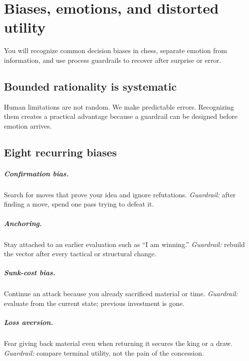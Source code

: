 
\chapter{Biases, emotions, and distorted utility}
\begin{learningbox}
You will recognize common decision biases in chess, separate emotion from information, and use process guardrails to recover after surprise or error.
\end{learningbox}

\section{Bounded rationality is systematic}
Human limitations are not random. We make predictable errors. Recognizing them creates a practical advantage because a guardrail can be designed before emotion arrives.

\section{Eight recurring biases}
\paragraph{Confirmation bias.} Search for moves that prove your idea and ignore refutations. \textit{Guardrail:} after finding a move, spend one pass trying to defeat it.

\paragraph{Anchoring.} Stay attached to an earlier evaluation such as ``I am winning.'' \textit{Guardrail:} rebuild the vector after every tactical or structural change.

\paragraph{Sunk-cost bias.} Continue an attack because you already sacrificed material or time. \textit{Guardrail:} evaluate from the current state; previous investment is gone.

\paragraph{Loss aversion.} Fear giving back material even when returning it secures the king or a draw. \textit{Guardrail:} compare terminal utility, not the pain of the concession.

